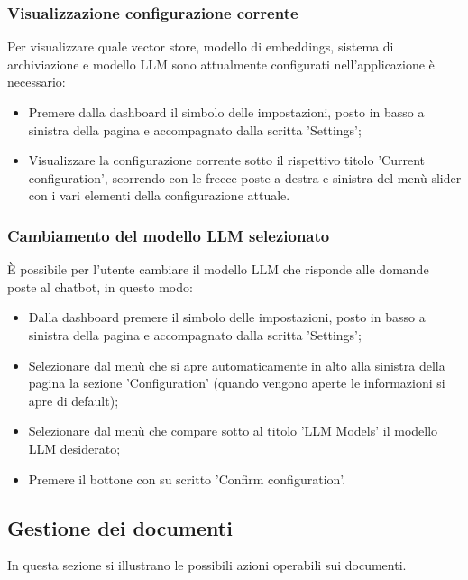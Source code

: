 \documentclass[10pt, a4paper]{article}
\begin{document}
\subsubsection{Visualizzazione configurazione corrente}
Per visualizzare quale vector store, modello di embeddings, sistema di archiviazione e modello LLM sono attualmente configurati nell'applicazione è necessario:
\begin{itemize}
    \item Premere dalla dashboard il simbolo delle impostazioni, posto in basso a sinistra della pagina e accompagnato dalla scritta 'Settings';
    \item Visualizzare la configurazione corrente sotto il rispettivo titolo 'Current configuration', scorrendo con le frecce poste a destra e sinistra del menù slider con i vari elementi della configurazione attuale.
\end{itemize}

\subsubsection{Cambiamento del modello LLM selezionato}
È possibile per l'utente cambiare il modello LLM che risponde alle domande poste al chatbot, in questo modo:
\begin{itemize}
    \item Dalla dashboard premere il simbolo delle impostazioni, posto in basso a sinistra della pagina e accompagnato dalla scritta 'Settings';
    \item Selezionare dal menù che si apre automaticamente in alto alla sinistra della pagina la sezione 'Configuration' (quando vengono aperte le informazioni si apre di default);
    \item Selezionare dal menù che compare sotto al titolo 'LLM Models' il modello LLM desiderato;
    \item Premere il bottone con su scritto 'Confirm configuration'.
\end{itemize}

\newpage
\subsection{Gestione dei documenti}
In questa sezione si illustrano le possibili azioni operabili sui documenti.
\end{document}

